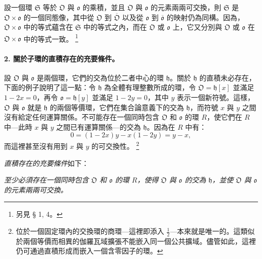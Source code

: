 \documentclass[11pt]{article}
\providecommand{\srcfn}[2]{%
  \begingroup
  \renewcommand{\thefootnote}{#1}%
  \footnote{#2}%
  \addtocounter{footnote}{-1}%
  \endgroup}
\begin{document}
設一個環 \(\mathfrak S\) 等於 \(\mathfrak O\) 與 \(\mathfrak o\) 的乘積，並且 \(\mathfrak O\) 與 \(\mathfrak o\) 的元素兩兩可交換，則 \(\mathfrak S\) 是 \(\mathfrak O\times\mathfrak o\) 的一個同態像，其中從 \(\mathfrak O\) 到 \(\overline{\mathfrak O}\) 以及從 \(\mathfrak o\) 到 \(\overline{\mathfrak o}\) 的映射仍為同構。因為，\(\mathfrak O\times\mathfrak o\) 中的等式蘊含在 \(\mathfrak S\) 中的等式之內，而在 \(\mathfrak O\) 或 \(\mathfrak o\) 上，它又分別與 \(\mathfrak O\) 或 \(\mathfrak o\) 在 \(\mathfrak O\times\mathfrak o\) 中的等式一致。\srcfn{8)}{另見 § 1, 4。}

\paragraph{2. 關於子環的直積存在的充要條件。}
設 \(\mathfrak O\) 與 \(\mathfrak o\) 是兩個環，它們的交為位於二者中心的環 \(\mathfrak h\)。關於 \(\mathfrak h\) 的直積未必存在，下面的例子說明了這一點：令 \(\mathfrak h\) 為全體有理整數所成的環，令 \(\mathfrak O=\mathfrak h[x]\) 並滿足 \(1-2x=0\)，再令 \(\mathfrak o=\mathfrak h[y]\) 並滿足 \(1-2y=0\)，其中 \(y\) 表示一個新符號。這樣，\(\mathfrak O\) 與 \(\mathfrak o\) 就是 \(\mathfrak h\) 的兩個等價環，它們在集合論意義下的交為 \(\mathfrak h\)，而符號 \(x\) 與 \(y\) 之間沒有給定任何運算關係。不可能存在一個同時包含 \(\mathfrak O\) 和 \(\mathfrak o\) 的環 \(R\)，使它們在 \(R\) 中---此時 \(x\) 與 \(y\) 之間已有運算關係---的交為 \(\mathfrak h\)。因為在 \(R\) 中有：
\[
0=(1-2x)y-x(1-2y)=y-x,
\]
而這裡甚至沒有用到 \(x\) 與 \(y\) 的可交換性。\srcfn{9)}{位於一個固定環內的交換環的商環---這裡即添入 \(\frac12\)---本來就是唯一的。這類似於兩個等價而相異的伽羅瓦域擴張不能嵌入同一個公共擴域。儘管如此，這裡仍可通過直積形成而嵌入一個含零因子的環。}

\emph{直積存在的充要條件}如下：

\emph{至少必須存在一個同時包含 \(\mathfrak O\) 和 \(\mathfrak o\) 的環 \(R\)，使得 \(\mathfrak O\) 與 \(\mathfrak o\) 的交為 \(\mathfrak h\)，並使 \(\mathfrak O\) 與 \(\mathfrak o\) 的元素兩兩可交換。}
\end{document}
